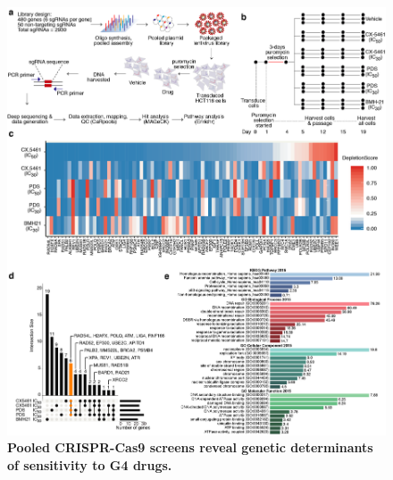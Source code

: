 
\begin{figure}
    \centering
    \includegraphics[width=1\textwidth]{../figures/Figure1_drug_screen}
    \caption[CX-5461 genetic screen schema]
            {\small{\textbf{Pooled CRISPR-Cas9 screens reveal genetic determinants of sensitivity to G4 drugs.}}
            }
        \label{fig:drug-screen}
\end{figure}
\addtocounter{figure}{-1}
